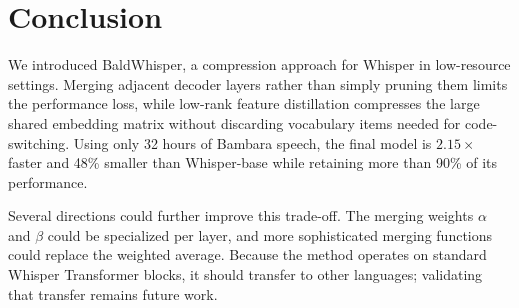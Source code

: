 \section{Conclusion}

We introduced BaldWhisper, a compression approach for Whisper in low-resource settings. Merging adjacent decoder layers rather than simply pruning them limits the performance loss, while low-rank feature distillation compresses the large shared embedding matrix without discarding vocabulary items needed for code-switching. Using only 32 hours of Bambara speech, the final model is \(2.15\times\) faster and 48\% smaller than Whisper-base while retaining more than 90\% of its performance.

Several directions could further improve this trade-off. The merging weights \(\alpha\) and \(\beta\) could be specialized per layer, and more sophisticated merging functions~\citep{yadav2023tiesmergingresolvinginterferencemerging,yu2024languagemodelssupermario} could replace the weighted average. Because the method operates on standard Whisper Transformer blocks, it should transfer to other languages; validating that transfer remains future work.
